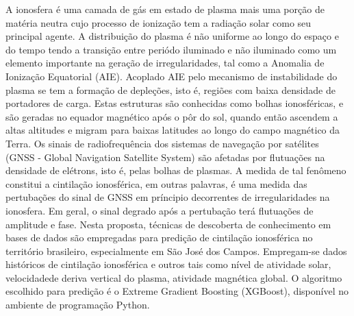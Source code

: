 
\begin{resumo}


\hypertarget{estilo:resumo}{} %

A ionosfera é uma camada de gás em estado de plasma mais uma porção de matéria neutra cujo processo de ionização tem a radiação solar como seu principal agente. A distribuição do plasma é não uniforme ao longo do espaço e do tempo tendo a transição entre periódo iluminado e não iluminado como um elemento importante na geração de irregularidades, tal como a Anomalia de Ionização Equatorial (AIE). Acoplado AIE pelo mecanismo de instabilidade do plasma se tem a formação de depleções, isto é, regiões com baixa densidade de portadores de carga. Estas estruturas são conhecidas como bolhas ionosféricas, e são geradas no equador magnético após o pôr do sol, quando então ascendem a altas altitudes e migram para baixas latitudes ao longo do campo magnético da Terra. Os sinais de radiofrequência dos sistemas de navegação por satélites (GNSS - Global Navigation Satellite System) são afetadas por flutuações na densidade de elétrons, isto é, pelas bolhas de plasmas. A medida de tal fenômeno constitui a cintilação ionosférica, em outras palavras, é uma medida das pertubações do sinal de GNSS em príncipio decorrentes de irregularidades na ionosfera. Em geral, o sinal degrado após a pertubação terá flutuações de amplitude e fase. Nesta proposta, técnicas de descoberta de conhecimento em bases de dados são empregadas para predição de cintilação ionosférica no território brasileiro, especialmente em São José dos Campos. Empregam-se dados históricos de cintilação ionosférica e outros tais como nível de atividade solar, velocidadede deriva vertical do plasma, atividade magnética global. O algoritmo escolhido para predição é o Extreme Gradient Boosting (XGBoost), disponível no ambiente de programação Python.

 
\end{resumo}
